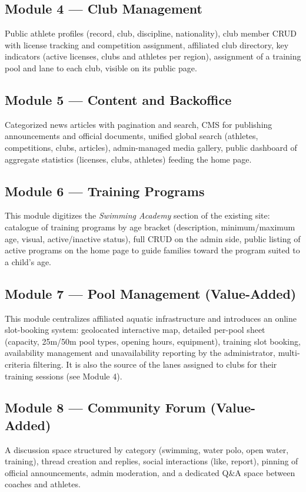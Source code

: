 \documentclass[conference]{IEEEtran}
\begin{document}
\subsection{Module 4 — Club Management}
Public athlete profiles (record, club, discipline, nationality), club member CRUD with license tracking and competition assignment, affiliated club directory, key indicators (active licenses, clubs and athletes per region), assignment of a training pool and lane to each club, visible on its public page.

\subsection{Module 5 — Content and Backoffice}
Categorized news articles with pagination and search, CMS for publishing announcements and official documents, unified global search (athletes, competitions, clubs, articles), admin-managed media gallery, public dashboard of aggregate statistics (licenses, clubs, athletes) feeding the home page.

\subsection{Module 6 — Training Programs}
This module digitizes the \emph{Swimming Academy} section of the existing site: catalogue of training programs by age bracket (description, minimum/maximum age, visual, active/inactive status), full CRUD on the admin side, public listing of active programs on the home page to guide families toward the program suited to a child's age.

\subsection{Module 7 — Pool Management (Value-Added)}
This module centralizes affiliated aquatic infrastructure and introduces an online slot-booking system: geolocated interactive map, detailed per-pool sheet (capacity, 25m/50m pool types, opening hours, equipment), training slot booking, availability management and unavailability reporting by the administrator, multi-criteria filtering. It is also the source of the lanes assigned to clubs for their training sessions (see Module 4).

\subsection{Module 8 — Community Forum (Value-Added)}
A discussion space structured by category (swimming, water polo, open water, training), thread creation and replies, social interactions (like, report), pinning of official announcements, admin moderation, and a dedicated Q\&A space between coaches and athletes.
\end{document}
